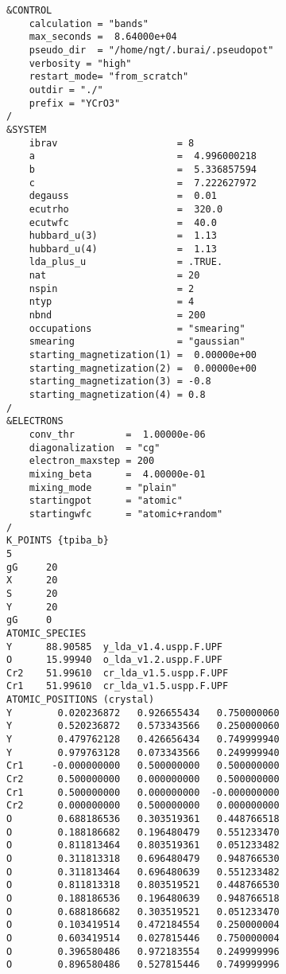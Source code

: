\begin{lstlisting}
&CONTROL
    calculation = "bands"
    max_seconds =  8.64000e+04
    pseudo_dir  = "/home/ngt/.burai/.pseudopot"
    verbosity = "high"
    restart_mode= "from_scratch"
    outdir = "./"
    prefix = "YCrO3"
/
&SYSTEM
    ibrav                     = 8
    a                         =  4.996000218
    b                         =  5.336857594
    c                         =  7.222627972
    degauss                   =  0.01
    ecutrho                   =  320.0
    ecutwfc                   =  40.0
    hubbard_u(3)              =  1.13
    hubbard_u(4)              =  1.13
    lda_plus_u                = .TRUE.
    nat                       = 20
    nspin                     = 2
    ntyp                      = 4
    nbnd                      = 200
    occupations               = "smearing"
    smearing                  = "gaussian"
    starting_magnetization(1) =  0.00000e+00
    starting_magnetization(2) =  0.00000e+00
    starting_magnetization(3) = -0.8
    starting_magnetization(4) = 0.8
/
&ELECTRONS
    conv_thr         =  1.00000e-06
    diagonalization  = "cg"
    electron_maxstep = 200
    mixing_beta      =  4.00000e-01
    mixing_mode      = "plain"
    startingpot      = "atomic"
    startingwfc      = "atomic+random"
/
K_POINTS {tpiba_b}
5
gG     20
X      20
S      20
Y      20
gG     0
ATOMIC_SPECIES
Y      88.90585  y_lda_v1.4.uspp.F.UPF
O      15.99940  o_lda_v1.2.uspp.F.UPF
Cr2    51.99610  cr_lda_v1.5.uspp.F.UPF
Cr1    51.99610  cr_lda_v1.5.uspp.F.UPF
ATOMIC_POSITIONS (crystal)
Y        0.020236872   0.926655434   0.750000060
Y        0.520236872   0.573343566   0.250000060
Y        0.479762128   0.426656434   0.749999940
Y        0.979763128   0.073343566   0.249999940
Cr1     -0.000000000   0.500000000   0.500000000
Cr2      0.500000000   0.000000000   0.500000000
Cr1      0.500000000   0.000000000  -0.000000000
Cr2      0.000000000   0.500000000   0.000000000
O        0.688186536   0.303519361   0.448766518
O        0.188186682   0.196480479   0.551233470
O        0.811813464   0.803519361   0.051233482
O        0.311813318   0.696480479   0.948766530
O        0.311813464   0.696480639   0.551233482
O        0.811813318   0.803519521   0.448766530
O        0.188186536   0.196480639   0.948766518
O        0.688186682   0.303519521   0.051233470
O        0.103419514   0.472184554   0.250000004
O        0.603419514   0.027815446   0.750000004
O        0.396580486   0.972183554   0.249999996
O        0.896580486   0.527815446   0.749999996
\end{lstlisting}

